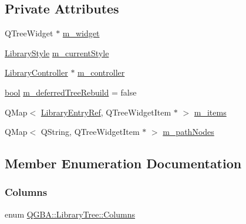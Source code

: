\subsection*{Private Attributes}
\begin{DoxyCompactItemize}
\item 
Q\+Tree\+Widget $\ast$ \mbox{\hyperlink{class_q_g_b_a_1_1_library_tree_a507840b24ad3d110bb44bb8ccbc4fdf3}{m\+\_\+widget}}
\item 
\mbox{\hyperlink{namespace_q_g_b_a_a4804d48d02699a2c1d2436e9269a8bb8}{Library\+Style}} \mbox{\hyperlink{class_q_g_b_a_1_1_library_tree_a38217361548c2c32eb15477f990be1fa}{m\+\_\+current\+Style}}
\item 
\mbox{\hyperlink{class_q_g_b_a_1_1_library_controller}{Library\+Controller}} $\ast$ \mbox{\hyperlink{class_q_g_b_a_1_1_library_tree_a616e48f8aa8e9eb59cd672d2ede2cf8c}{m\+\_\+controller}}
\item 
\mbox{\hyperlink{libretro_8h_a4a26dcae73fb7e1528214a068aca317e}{bool}} \mbox{\hyperlink{class_q_g_b_a_1_1_library_tree_ab27f41497bcb61a768f0283648f6af2a}{m\+\_\+deferred\+Tree\+Rebuild}} = false
\item 
Q\+Map$<$ \mbox{\hyperlink{namespace_q_g_b_a_a201fa9f2cb8f778666a134ba81909358}{Library\+Entry\+Ref}}, Q\+Tree\+Widget\+Item $\ast$ $>$ \mbox{\hyperlink{class_q_g_b_a_1_1_library_tree_a207236b86af5bb3c549895bef68fb0cf}{m\+\_\+items}}
\item 
Q\+Map$<$ Q\+String, Q\+Tree\+Widget\+Item $\ast$ $>$ \mbox{\hyperlink{class_q_g_b_a_1_1_library_tree_a59d386067d287bef2a4543af33709d48}{m\+\_\+path\+Nodes}}
\end{DoxyCompactItemize}


\subsection{Member Enumeration Documentation}
\mbox{\label{class_q_g_b_a_1_1_library_tree_a019d167b263ccb0a08d0be54a13f11e3}} 
\subsubsection{\texorpdfstring{Columns}{Columns}}
{\footnotesize\ttfamily enum \mbox{\hyperlink{class_q_g_b_a_1_1_library_tree_a019d167b263ccb0a08d0be54a13f11e3}{Q\+G\+B\+A\+::\+Library\+Tree\+::\+Columns}}}

